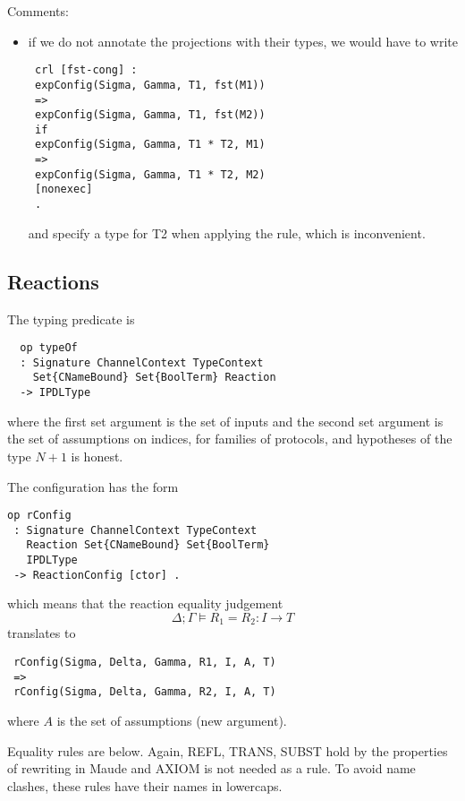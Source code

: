 \documentclass{article}
\begin{document}
Comments:
\begin{itemize}
\item if we do not annotate the projections with their types, we would have to write
\begin{lstlisting}
 crl [fst-cong] :
 expConfig(Sigma, Gamma, T1, fst(M1))
 => 
 expConfig(Sigma, Gamma, T1, fst(M2)) 
 if
 expConfig(Sigma, Gamma, T1 * T2, M1)
 => 
 expConfig(Sigma, Gamma, T1 * T2, M2) 
 [nonexec]
 .
\end{lstlisting}
\noindent and specify a type for T2 when applying the rule, which is
inconvenient.
\end{itemize}

\subsection{Reactions}

The typing predicate is
\begin{lstlisting}
  op typeOf 
  : Signature ChannelContext TypeContext 
    Set{CNameBound} Set{BoolTerm} Reaction 
  -> IPDLType 
\end{lstlisting}
\noindent where the first set argument is the set of inputs 
and the second set argument is the set of assumptions on indices,
for families of protocols, and hypotheses of the type $N + 1$ is honest.

The configuration has the form
\begin{lstlisting}
op rConfig 
 : Signature ChannelContext TypeContext
   Reaction Set{CNameBound} Set{BoolTerm} 
   IPDLType 
 -> ReactionConfig [ctor] .
\end{lstlisting}

\noindent which means that the reaction equality judgement
$$\Delta ; \Gamma \vDash R_1 = R_2 : I \rightarrow T$$
translates to
\begin{lstlisting}
 rConfig(Sigma, Delta, Gamma, R1, I, A, T)
 =>
 rConfig(Sigma, Delta, Gamma, R2, I, A, T) 
\end{lstlisting}
\noindent where $A$ is the set of assumptions (new argument).

Equality rules are below. Again,
 REFL, TRANS, SUBST hold by the properties of rewriting in Maude and
 AXIOM is not needed as a rule. 
 To avoid name clashes, these rules have their names in 
 lowercaps.
 
\end{document}
